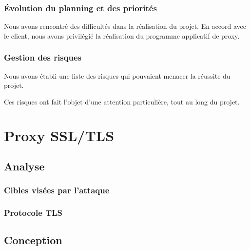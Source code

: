 \documentclass[a4paper,11pt,french]{report}
\begin{document}
\subsection{Évolution du planning et des priorités}

Nous avons rencontré des difficultés dans la réalisation du projet.
En accord avec le client, nous avons privilégié la réalisation du programme applicatif de proxy.

\subsection{Gestion des risques}

Nous avons établi une liste des risques qui pouvaient menacer la réussite du projet.

Ces risques ont fait l'objet d'une attention particulière, tout au long du projet.

\chapter{Proxy SSL/TLS}
\section{Analyse}

\subsection{Cibles visées par l'attaque}

\subsection{Protocole TLS}


\section{Conception}
\end{document}
